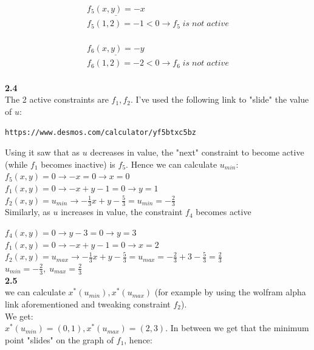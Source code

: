 \documentclass[fleqn]{article}
\begin{document}
\begin{multline*}
\underline{f_5(x,y) = -x} \\
f_5(1,2) = -1<0 \rightarrow \boxed{f_5 \; is \; not \; active}
\end{multline*} \\

\begin{multline*}
\underline{f_6(x,y) = -y} \\
f_6(1,2) = -2<0 \rightarrow \boxed{f_6 \; is \; not \; active}
\end{multline*} \\

\textbf{2.4} \\
The 2 active constraints are $f_1, f_2$. I've used the following link to "slide" the value of $u$:
\begin{lstlisting}[breaklines]
https://www.desmos.com/calculator/yf5btxc5bz
\end{lstlisting} 

Using it saw that as $u$ decreases in value, the "next" constraint to become active (while $f_1$ becomes inactive) is $f_5$. Hence we can calculate $u_{min}$: \\

$f_5(x,y)=0 \rightarrow -x=0 \rightarrow x=0$\\

$f_1(x,y)=0 \rightarrow -x+y-1=0 \rightarrow y=1$\\

$f_2(x,y)=u_{min} \rightarrow -\frac{1}{3}x+y-\frac{5}{3}=u_{min} =
-\frac{2}{3}$\\


Similarly, as $u$ increases in value, the constraint $f_4$ becomes active

$f_4(x,y)=0 \rightarrow y-3=0 \rightarrow y=3$\\

$f_1(x,y)=0 \rightarrow -x+y-1=0 \rightarrow x=2$\\

$f_2(x,y)=u_{max} \rightarrow -\frac{1}{3}x+y-\frac{5}{3}=u_{max} =
-\frac{2}{3}+3-\frac{5}{3} = \frac{2}{3}$\\


$u_{min} = -\frac{2}{3}, \; u_{max} = \frac{2}{3}$\\


\textbf{2.5} \\
we can calculate $x^*(u_{min}), x^*(u_{max})$ (for example by using the wolfram alpha link aforementioned and tweaking constraint $f_2$).\\
We get: \\
$x^*(u_{min}) = (0,1), x^*(u_{max}) = (2,3)$. In between we get that the minimum point "slides" on the graph of $f_1$, hence: \\
\end{document}
